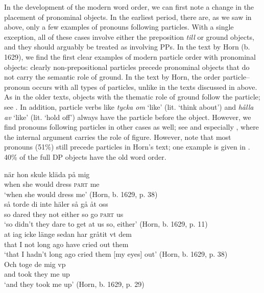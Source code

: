\documentclass[output=paper]{langscibook}
\begin{document}
In the development of the modern word order, we can first note a change in the placement of pronominal objects. In the earliest period, there are, as we saw in  above, only a few examples of pronouns following particles. With a single exception, all of these cases involve either the preposition \textit{till} or ground objects, and they should arguably be treated as involving PPs. In the text by Horn (b. 1629), we find the first clear examples of modern particle order with pronominal objects: clearly non-prepositional particles precede pronominal objects that do not carry the semantic role of ground. In the text by Horn, the order particle–pronoun occurs with all types of particles, unlike in the texts discussed in  above. As in the older texts, objects with the thematic role of ground follow the particle; see . In addition, particle verbs like \textit{tycka om} ‘like’ (lit. ‘think about’) and \textit{hålla av} ‘like’ (lit. ‘hold off’) always have the particle before the object. However, we find pronouns following particles in other cases as well; see  and especially , where the internal argument carries the role of figure. However, note that most pronouns (51\%) still precede particles in Horn’s text; one example is given in . 40\% of the full DP objects have the old word order.


\ea\label{ex:lalu:32}
\ea\label{ex:lalu:32a}
\gll  när   hon   skule     kläda  på   mig\\
    when   she   would   dress    \textsc{part}   me\\
\glt `when she would dress me’ (Horn, b. 1629, p. 38)\\

\ex\label{ex:lalu:32b}
\gll  så   torde     di     inte   häler     så  gå    åt     oss\\
    so   dared   they   not   either   so  go    \textsc{part}   us\\
\glt `so didn’t they dare to get at us so, either’ (Horn, b. 1629, p. 11)\\
\ex\label{ex:lalu:32c}
\gll at       iag   icke   länge   sedan   har   gråtit   vt     dem \\
    that    I     not   long     ago     have   cried     out   them\\
\glt `that I hadn’t long ago cried them [my eyes] out’ (Horn, b. 1629, p. 38)\\
\z
\ex\label{ex:lalu:33}
\gll  Och       toge   de     mig   vp \\
and     took   they   me   up\\
\glt `and they took me up’ (Horn, b. 1629, p. 29)\\
\z
\end{document}
